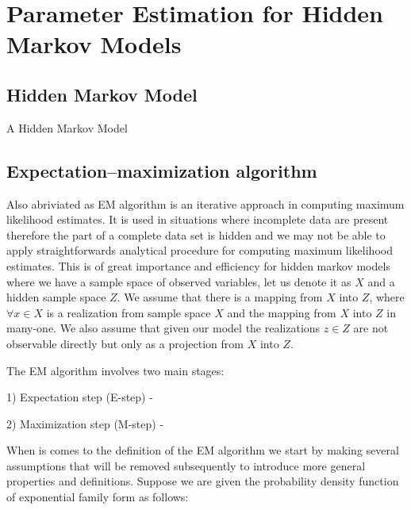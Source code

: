 
\chapter{Parameter Estimation for Hidden Markov Models}

\ifpdf
    \graphicspath{{Chapter2/Figs/Raster/}{Chapter2/Figs/PDF/}{Chapter2/Figs/}}
\else
    \graphicspath{{Chapter2/Figs/Vector/}{Chapter2/Figs/}}
\fi

\section{Hidden Markov Model}

A Hidden Markov Model 



\section{ Expectation–maximization algorithm}

Also abriviated as EM algorithm is an iterative approach in computing maximum likelihood estimates. It is used in situations where incomplete data are present therefore the part of a complete data set is hidden and we may not be able to apply straightforwards analytical procedure for computing maximum likelihood estimates. This is of great importance and efficiency for hidden markov models where we have a sample space of observed variables, let us denote it as $X$ and a hidden sample space $Z$. We assume that there is a mapping from $X$ into $Z$, where $\forall x \in X$ is a realization from sample space $X$ and the mapping from $X$ into $Z$ in many-one. We also assume that given our model the realizations $z \in Z$ are not observable directly but only as a projection from $X$ into $Z$. 


The EM algorithm involves two main stages:

1) Expectation step (E-step) - 

2) Maximization step (M-step) - 


When is comes to the definition of the EM algorithm we start by making several assumptions that will be removed subsequently to introduce more general properties and definitions. 
Suppose we are given the probability density function of exponential family form as follows:

